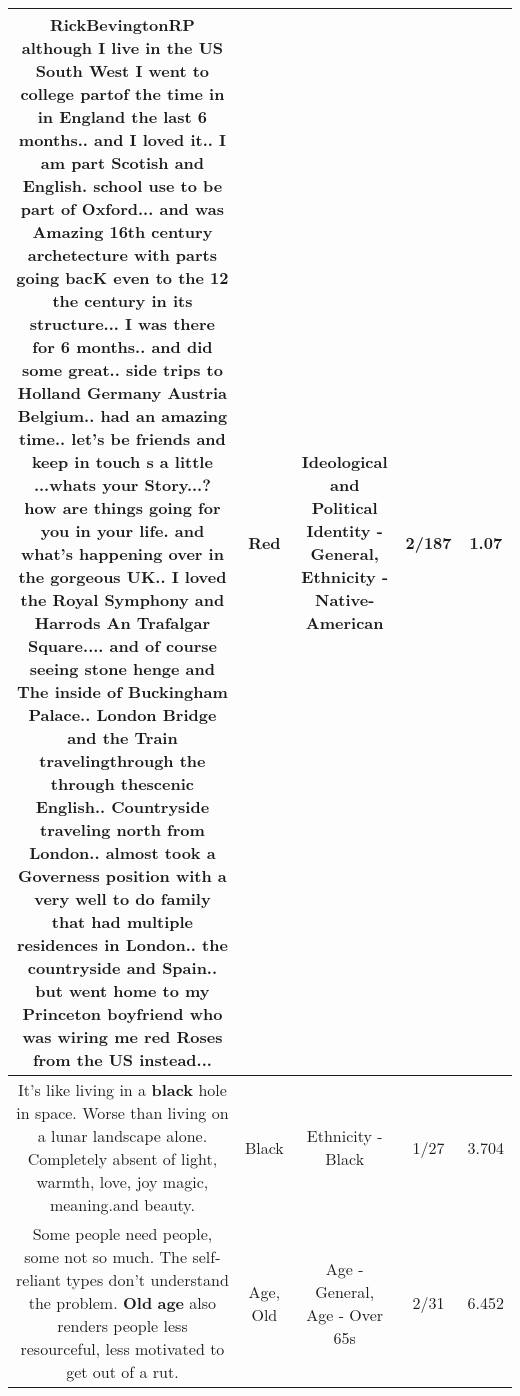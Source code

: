 \documentclass[11pt]{article}
\newlength\mylength
\begin{document}
\begin{center}
\begin{longtable}{|C{.65\mylength}|C{.30\mylength}|C{.12\mylength}|C{.12\mylength}|C{.12\mylength}|}
  \small RickBevingtonRP although I live in the US South West I went to college partof the time in in England the last 6 months.. and I loved it.. I am part Scotish and English. school use to be part of Oxford... and was Amazing 16th century archetecture with parts going bacK even to the 12 the century in its structure... I was there for 6 months.. and did some  great.. side trips to Holland Germany Austria  Belgium.. had an amazing time.. let's be friends and keep in touch s a little ...whats your Story...? how are things going for you in your life. and what's happening over in the gorgeous UK.. I loved the Royal Symphony and Harrods An Trafalgar Square.... and of course seeing stone henge and The inside of Buckingham Palace.. London Bridge and the Train travelingthrough the through thescenic English.. Countryside traveling north from London.. almost took a Governess position with a very well to do family that had multiple residences in London.. the countryside and Spain.. but went home to my Princeton boyfriend who was wiring me \textbf{r\textbf{ed}} Roses from the US instead...\normalsize   & Red &  Ideological and Political Identity - General, Ethnicity - Native-American & 2/187 & 1.07 \\  \hline
  \small It's like living in a \textbf{black} hole in space. Worse than living on a lunar landscape alone. Completely absent of light, warmth, love, joy magic, meaning.and beauty.\normalsize   & Black & Ethnicity - Black & 1/27 & 3.704 \\  \hline
  \small Some people need people, some not so much. The self- reliant types don't understand the problem. \textbf{Old} \textbf{age} also renders people less resourceful, less motivated to get out of a rut.\normalsize   & Age, Old & Age - General, Age - Over 65s & 2/31 & 6.452 \\  \hline

\end{longtable}
\end{center}
\end{document}
